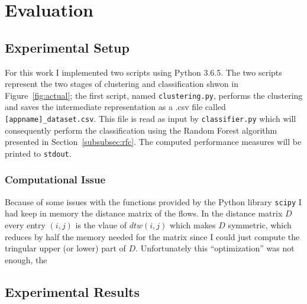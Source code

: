 \section{Evaluation}
\subsection{Experimental Setup}
For this work I implemented two scripts using Python 3.6.5. The two scripts represent the two stages of clustering and classification shwon in Figure~\ref{fig:actual}; the first script, named \texttt{clustering.py}, performs the clustering and saves the intermediate representation as a .csv file called \texttt{[appname]\_dataset.csv}. This file is read as input by \texttt{classifier.py} which will consequently perform the classification using the Random Forest algorithm presented in Section~\ref{subsubsec:rfc}. The computed performance measures will be printed to \texttt{stdout}.

\subsubsection{Computational Issue}
Because of some issues with the functions provided by the Python library \texttt{scipy} I had keep in memory the distance matrix of the flows. In the distance matrix $D$ every entry $(i,j)$ is the vlaue of $dtw(i, j)$ which makes $D$ symmetric, which reduces by half the memory needed for the matrix since I could just compute the tringular upper (or lower) part of $D$. Unfortunately this ``optimization'' was not enough, the

\subsection{Experimental Results}
